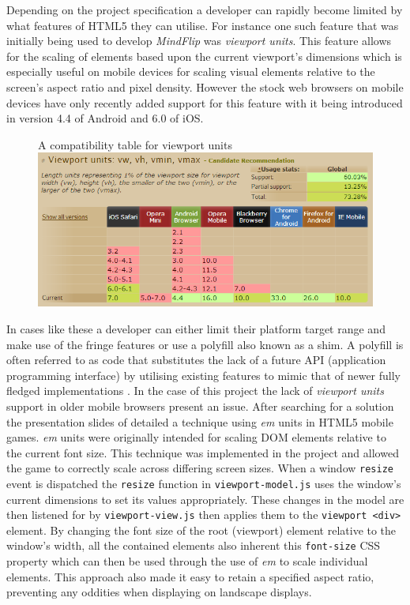 \documentclass[final]{cmpreport}
\begin{document}
Depending on the project specification a developer can rapidly become limited by what features of HTML5 they can utilise. For instance one such feature that was initially being used to develop \textit{MindFlip} was \textit{viewport units}. This feature allows for the scaling of elements based upon the current viewport's dimensions which is especially useful on mobile devices for scaling visual elements relative to the screen's aspect ratio and pixel density. However the stock web browsers on mobile devices have only recently added support for this feature with it being introduced in version 4.4 of Android and 6.0 of iOS.

\begin{figure}[h]{A compatibility table for viewport units \label{viewport}}
  \includegraphics[width=1.0\textwidth]{viewport-units.png}
\end{figure}

In cases like these a developer can either limit their platform target range and make use of the fringe features or use a polyfill also known as a shim. A polyfill is often referred to as code that substitutes the lack of a future API (application programming interface) by utilising existing features to mimic that of newer fully fledged implementations \cite{Lawson}. In the case of this project the lack of \textit{viewport units} support in older mobile browsers present an issue. After searching for a solution the presentation slides of \cite{Kadrmas} detailed a technique using \textit{em} units in HTML5 mobile games. \textit{em} units were originally intended for scaling DOM elements relative to the current font size. This technique was implemented in the project and allowed the game to correctly scale across differing screen sizes. When a window \texttt{resize} event is dispatched the \texttt{resize} function in \texttt{viewport-model.js} uses the window's current dimensions to set its values appropriately. These changes in the model are then listened for by \texttt{viewport-view.js} then applies them to the \texttt{viewport <div>} element. By changing the font size of the root (viewport) element relative to the window's width, all the contained elements also inherent this \texttt{font-size} CSS property which can then be used through the use of \textit{em} to scale individual elements. This approach also made it easy to retain a specified aspect ratio, preventing any oddities when displaying on landscape displays.
\end{document}
